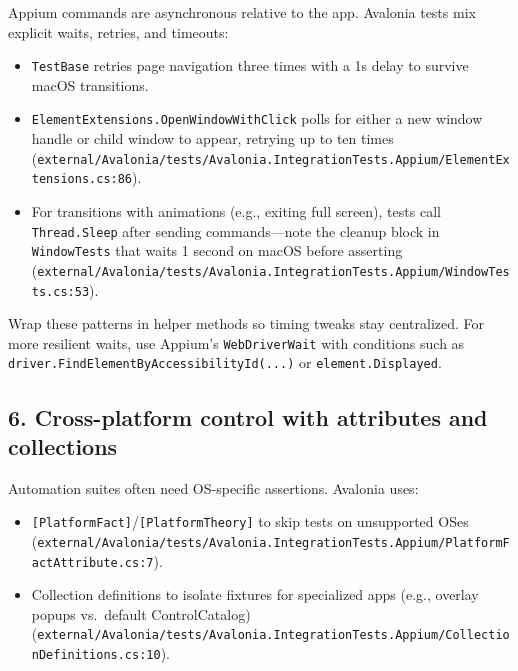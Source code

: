 Appium commands are asynchronous relative to the app. Avalonia tests mix
explicit waits, retries, and timeouts:

\begin{itemize}
\tightlist
\item
  \passthrough{\lstinline!TestBase!} retries page navigation three times
  with a 1s delay to survive macOS transitions.
\item
  \passthrough{\lstinline!ElementExtensions.OpenWindowWithClick!} polls
  for either a new window handle or child window to appear, retrying up
  to ten times
  (\passthrough{\lstinline!external/Avalonia/tests/Avalonia.IntegrationTests.Appium/ElementExtensions.cs:86!}).
\item
  For transitions with animations (e.g., exiting full screen), tests
  call \passthrough{\lstinline!Thread.Sleep!} after sending
  commands---note the cleanup block in
  \passthrough{\lstinline!WindowTests!} that waits 1 second on macOS
  before asserting
  (\passthrough{\lstinline!external/Avalonia/tests/Avalonia.IntegrationTests.Appium/WindowTests.cs:53!}).
\end{itemize}

Wrap these patterns in helper methods so timing tweaks stay centralized.
For more resilient waits, use Appium's
\passthrough{\lstinline!WebDriverWait!} with conditions such as
\passthrough{\lstinline!driver.FindElementByAccessibilityId(...)!} or
\passthrough{\lstinline!element.Displayed!}.

\subsection{6. Cross-platform control with attributes and
collections}\label{cross-platform-control-with-attributes-and-collections}

Automation suites often need OS-specific assertions. Avalonia uses:

\begin{itemize}
\tightlist
\item
  \passthrough{\lstinline![PlatformFact]!}/\passthrough{\lstinline![PlatformTheory]!}
  to skip tests on unsupported OSes
  (\passthrough{\lstinline!external/Avalonia/tests/Avalonia.IntegrationTests.Appium/PlatformFactAttribute.cs:7!}).
\item
  Collection definitions to isolate fixtures for specialized apps (e.g.,
  overlay popups vs.~default ControlCatalog)
  (\passthrough{\lstinline!external/Avalonia/tests/Avalonia.IntegrationTests.Appium/CollectionDefinitions.cs:10!}).
\end{itemize}

